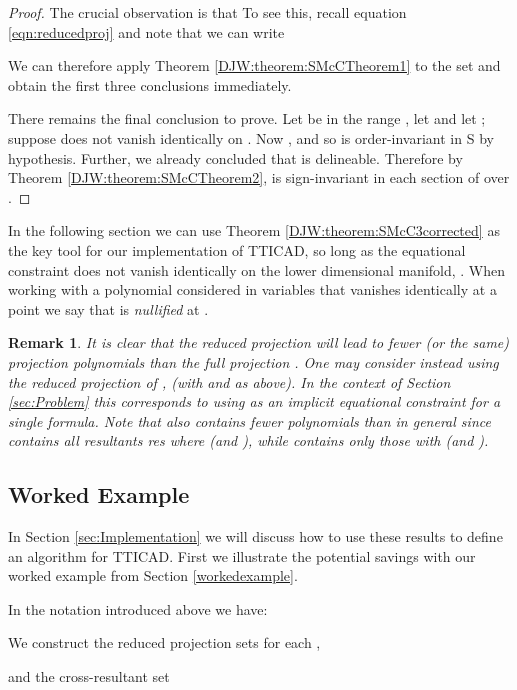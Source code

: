 \documentclass{article}
\newtheorem{remark}[theorem]{Remark}
\begin{document}
\begin{proof}
The crucial observation is that 
 To see this, recall equation \eqref{eqn:reducedproj} and note that we can write


We can therefore apply Theorem \ref{DJW:theorem:SMcCTheorem1} to the set  and obtain the first three conclusions immediately.

There remains the final conclusion to prove. Let  be in the range , let  and let ; suppose  does not vanish identically on . Now , and so is order-invariant in S by hypothesis. Further, we already concluded that  is delineable. Therefore by Theorem \ref{DJW:theorem:SMcCTheorem2},  is sign-invariant in each section of  over . 
\end{proof}

In the following section we can use Theorem \ref{DJW:theorem:SMcC3corrected} as the key tool for our implementation of TTICAD, so long as the equational constraint  does not vanish identically on the lower dimensional manifold, .  When working with a polynomial  considered in  variables that vanishes identically at a point   we say that  is {\em nullified} at .

\begin{remark}
It is clear that the reduced projection  will lead to fewer (or the same) projection polynomials than the full projection .  
One may consider instead using the reduced projection  of \cite{McCallum1999a}, (with  and  as above).  In the context of Section \ref{sec:Problem} this corresponds to using  as an implicit equational constraint for a single formula.  Note that  also contains fewer polynomials than  in general since  contains all resultants res where  (and ), while  contains only those with  (and ).
\end{remark}

\subsection{Worked Example}
\label{subsec:workedexample2}

In Section \ref{sec:Implementation} we will discuss how to use these results to define an algorithm for TTICAD. First we illustrate the potential savings with our worked example from Section \ref{workedexample}.

In the notation introduced above we have:

We construct the reduced projection sets for each ,

and the cross-resultant set
\end{document}
